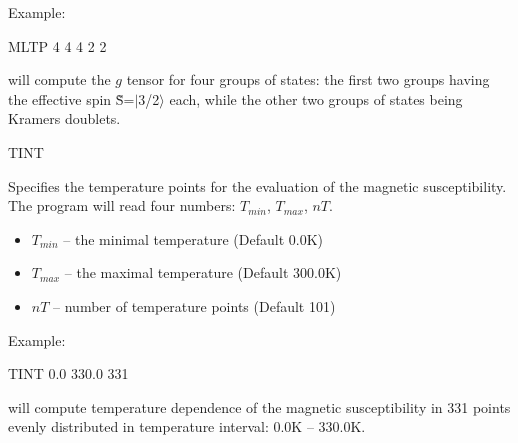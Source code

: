 \begin{keywordlist}
Example:
\begin{inputlisting}
MLTP
4
4 4 2 2
\end{inputlisting}
 will compute the $g$ tensor for four groups of states:
the first two groups having the effective spin \~{S}=$|$3/2$\rangle$ each, while
the other two groups of states being Kramers doublets.





\item[TINT]

Specifies the temperature points for the evaluation of the magnetic susceptibility. The program will read four numbers: $T_{min}$, $T_{max}$, $nT$.
\begin{itemize}
 \item $T_{min}$ -- the minimal temperature (Default 0.0K)
 \item $T_{max}$ -- the maximal temperature (Default 300.0K)
 \item $nT$      -- number of temperature points (Default 101)
\end{itemize}
Example:
\begin{inputlisting}
TINT
0.0  330.0  331
\end{inputlisting}
 will compute temperature dependence of the magnetic susceptibility in 331 points evenly distributed in temperature interval: 0.0K -- 330.0K.





\end{keywordlist}
